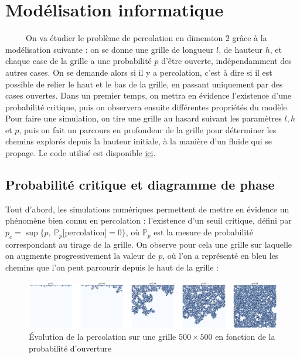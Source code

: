 \documentclass[11pt,a4paper]{article}
\begin{document}
\section{Modélisation informatique}
\ \ \ \ \ On va étudier le problème de percolation en dimension $2$ grâce à la modélisation suivante : on se donne une grille de longueur $l$, de hauteur $h$, et chaque case de la grille a une probabilité $p$ d'être ouverte, indépendamment des autres cases. On se demande alors si il y a percolation, c'est à dire si il est possible de relier le haut et le bas de la grille, en passant uniquement par des cases ouvertes. Dans un premier temps, on mettra en évidence l'existence d'une probabilité critique, puis on observera ensuite différentes propriétés du modèle. \\
Pour faire une simulation, on tire une grille au hasard suivant les paramètres $l,h$ et $p$, puis on fait un parcours en profondeur de la grille pour déterminer les chemins explorés depuis la hauteur initiale, à la manière d'un fluide qui se propage. Le code utilisé est disponible \href{https://github.com/Hazdard}{ici}.

\subsection{Probabilité critique et diagramme de phase}

Tout d'abord, les simulations numériques permettent de mettre en évidence un phénomène bien connu en percolation : l'existence d'un seuil critique, défini par $p_c = \sup{ \{p, \ \mathbb{P}_p[\text{percolation]}=0 \} }$, où $ \mathbb{P}_p$ est la mesure de probabilité correspondant au tirage de la grille. On observe pour cela une grille sur laquelle on augmente progressivement la valeur de $p$, où l'on a représenté en bleu les chemins que l'on peut parcourir depuis le haut de la grille : 

\begin{figure}[htbp]
    \centering
    \includegraphics[width=1 \textwidth]{./Pictures/evolution2.png}
    \caption{Évolution de la percolation sur une grille $500\times 500$ en fonction de la probabilité d'ouverture}
    \label{fig:evol}
\end{figure}
\end{document}

